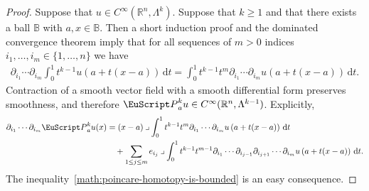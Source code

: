 \documentclass[10pt,a4paper]{amsart}
\theoremstyle{definition}
\theoremstyle{remark}
\numberwithin{equation}{section}
\newcommand{\bbB}{{\mathbb B}}
\newcommand{\bbR}{{\mathbb R}}
\newcommand{\euP}{{\EuScript P}}
\newcommand{\smallball}{\bbB}
\newcommand{\dif}{{\mathrm d}}
\newcommand{\contract}{\mathbin{\lrcorner}}
\newcommand{\Alt}[1]{\Lambda^{#1}}
\newcommand{\Poincare}{\euP}
\begin{document}
\begin{proof}
    Suppose that $u \in C^{\infty}(\bbR^{n},\Alt{k})$.
    Suppose that $k \geq 1$ and that there exists a ball $\smallball$ with $a, x \in \smallball$.
    Then a short induction proof and the dominated convergence theorem imply 
    that for all sequences of $m > 0$ indices $i_{1},\dots,i_{m} \in \{ 1, \dots, n \}$ we have 
    \begin{gather*}
        \partial_{i_{1}} \cdots \partial_{i_{m}}
        \int_{0}^{1} t^{k-1} u\left(a+t(x-a)\right)\,\dif t
        = 
        \int_{0}^{1} t^{k-1} t^{m}
        \partial_{i_{1}} \cdots \partial_{i_{m}}
        u\left(a+t(x-a)\right)\,\dif t
        .
    \end{gather*}
    Contraction of a smooth vector field with a smooth differential form preserves smoothness, 
    and therefore $\Poincare^{k}_{a} u \in C^{\infty}(\bbR^{n},\Alt{k-1})$. 
    Explicitly, 
    \begin{align*}
        \partial_{i_{1}} \cdots \partial_{i_{m}}
        \Poincare^{k}_{a} u(x)
        &
        =
        (x-a) 
        \contract 
        \int_{0}^{1} t^{k-1} t^{m}
        \partial_{i_{1}} \cdots \partial_{i_{m}}
        u\left(a+t(x-a)\right)\,\dif t
        \\&\quad 
        +
        \sum_{1 \leq j \leq m}
        e_{i_{j}}
        \contract 
        \int_{0}^{1} t^{k-1} t^{m-1}
        \partial_{i_{1}} \cdots \partial_{i_{j-1}} \partial_{i_{j+1}} \cdots \partial_{i_{m}}
        u\left(a+t(x-a)\right)\,\dif t
        .
    \end{align*}
    The inequality~\eqref{math:poincare-homotopy-is-bounded} is an easy consequence. 
    

\end{proof}
\end{document}
